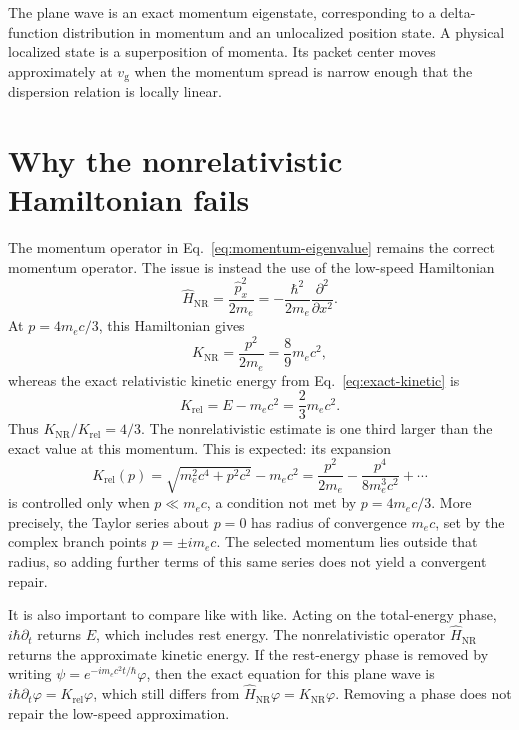 \documentclass[12pt]{article}
\begin{document}
The plane wave is an exact momentum eigenstate, corresponding to a delta-function distribution in momentum and an unlocalized position state. A physical localized state is a superposition of momenta. Its packet center moves approximately at $v_{\mathrm g}$ when the momentum spread is narrow enough that the dispersion relation is locally linear.

\section{Why the nonrelativistic Hamiltonian fails}

The momentum operator in Eq.~\eqref{eq:momentum-eigenvalue} remains the correct momentum operator. The issue is instead the use of the low-speed Hamiltonian
\begin{equation}
  \hat H_{\mathrm{NR}}=\frac{\hat p_x^2}{2m_e}
  =-\frac{\hbar^2}{2m_e}\frac{\partial^2}{\partial x^2}.
  \label{eq:nonrel-hamiltonian}
\end{equation}
At $p=4m_ec/3$, this Hamiltonian gives
\begin{equation}
  K_{\mathrm{NR}}=\frac{p^2}{2m_e}=\frac{8}{9}m_ec^2,
  \label{eq:nonrel-kinetic}
\end{equation}
whereas the exact relativistic kinetic energy from Eq.~\eqref{eq:exact-kinetic} is
\begin{equation}
  K_{\mathrm{rel}}=E-m_ec^2=\frac{2}{3}m_ec^2.
  \label{eq:rel-kinetic-again}
\end{equation}
Thus $K_{\mathrm{NR}}/K_{\mathrm{rel}}=4/3$. The nonrelativistic estimate is one third larger than the exact value at this momentum. This is expected: its expansion
\begin{equation}
  K_{\mathrm{rel}}(p)
  =\sqrt{m_e^2c^4+p^2c^2}-m_ec^2
  =\frac{p^2}{2m_e}-\frac{p^4}{8m_e^3c^2}+\cdots
  \label{eq:kinetic-expansion}
\end{equation}
is controlled only when $p\ll m_ec$, a condition not met by $p=4m_ec/3$. More precisely, the Taylor series about $p=0$ has radius of convergence $m_ec$, set by the complex branch points $p=\pm i m_ec$. The selected momentum lies outside that radius, so adding further terms of this same series does not yield a convergent repair.

It is also important to compare like with like. Acting on the total-energy phase, $i\hbar\partial_t$ returns $E$, which includes rest energy. The nonrelativistic operator $\hat H_{\mathrm{NR}}$ returns the approximate kinetic energy. If the rest-energy phase is removed by writing $\psi=e^{-im_ec^2t/\hbar}\varphi$, then the exact equation for this plane wave is $i\hbar\partial_t\varphi=K_{\mathrm{rel}}\varphi$, which still differs from $\hat H_{\mathrm{NR}}\varphi=K_{\mathrm{NR}}\varphi$. Removing a phase does not repair the low-speed approximation.
\end{document}
